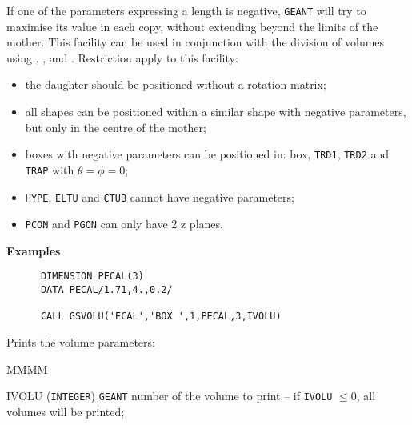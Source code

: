 If one of the parameters expressing a length is negative,
{\tt GEANT} will try to maximise its value in each copy, without
extending beyond the limits of the mother. This
facility can be used in conjunction with the
division of volumes using , , and .
Restriction apply to this facility:
\begin{itemize}
\item the daughter should be positioned without a rotation matrix;
\item all shapes can be positioned within a similar shape with negative
parameters, but only in the centre of the mother;
\item boxes with negative parameters can be positioned in: box, {\tt TRD1},
{\tt TRD2} and {\tt TRAP} with $\theta = \phi = 0$;
\item {\tt HYPE}, {\tt ELTU} and {\tt CTUB} cannot have negative parameters;
\item {\tt PCON} and {\tt PGON} can only have 2 z planes.
\end{itemize}
{\bf Examples}
\begin{verbatim}
      DIMENSION PECAL(3)
      DATA PECAL/1.71,4.,0.2/
 
      CALL GSVOLU('ECAL','BOX ',1,PECAL,3,IVOLU)
\end{verbatim}
Prints the volume parameters:
\begin{DLtt}{MMMM}
\item[IVOLU]  ({\tt INTEGER}) {\tt GEANT} number of the volume to print -- if
{\tt IVOLU} $\leq 0$, all volumes will be printed;
\end{DLtt}
